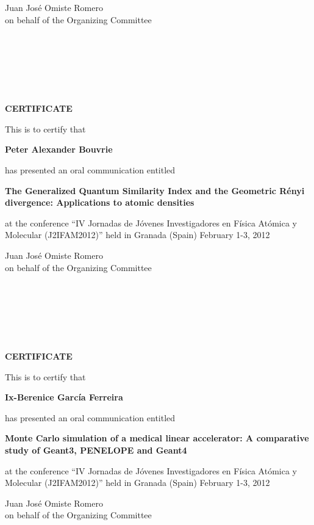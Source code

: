 \documentclass [13pt,a4paper] {letter}
\begin{document}
\vspace {3cm}
\begin{raggedleft}
Juan José Omiste Romero\\
on behalf of the Organizing Committee
\newpage
\end{raggedleft}
\begin{verbatim}






\end{verbatim}
\pagestyle{empty}
\begin{center}
{\bf {\Huge CERTIFICATE}}

\vspace {1.5cm}
This is to certify that
\vspace {1cm}

{\bf \Large  Peter  Alexander  Bouvrie }
\vspace {1cm}

has presented an oral communication entitled
\vspace {1cm}

{\bf \large  The Generalized Quantum Similarity Index and the Geometric Rényi divergence: Applications to atomic densities }
\vspace {1cm}

at the conference { \textquotedblleft IV Jornadas de Jóvenes Investigadores en Física Atómica y Molecular (J2IFAM2012)\textquotedblright} 
held in Granada (Spain) February 1-3, 2012
\end{center}
\vspace {3cm}
\begin{raggedleft}
Juan José Omiste Romero\\
on behalf of the Organizing Committee
\newpage
\end{raggedleft}
\begin{verbatim}






\end{verbatim}
\pagestyle{empty}
\begin{center}
{\bf {\Huge CERTIFICATE}}

\vspace {1.5cm}
This is to certify that
\vspace {1cm}

{\bf \Large  Ix-Berenice    García Ferreira }
\vspace {1cm}

has presented an oral communication entitled
\vspace {1cm}

{\bf \large  Monte Carlo simulation of a medical linear accelerator: A comparative study of Geant3, PENELOPE and Geant4 }
\vspace {1cm}

at the conference { \textquotedblleft IV Jornadas de Jóvenes Investigadores en Física Atómica y Molecular (J2IFAM2012)\textquotedblright} 
held in Granada (Spain) February 1-3, 2012
\end{center}
\vspace {3cm}
\begin{raggedleft}
Juan José Omiste Romero\\
on behalf of the Organizing Committee
\newpage
\end{raggedleft}
\end{document}
